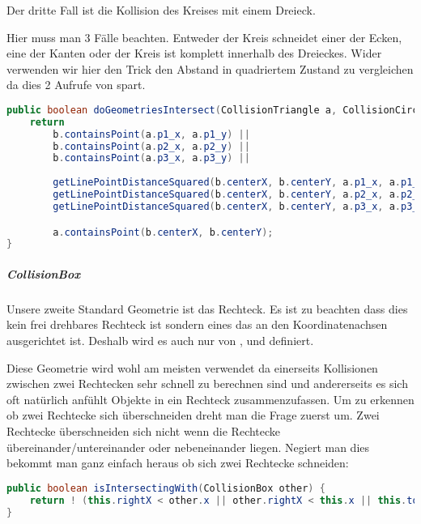 Der dritte Fall ist die Kollision des Kreises mit einem Dreieck.

Hier muss man 3 Fälle beachten. Entweder der Kreis schneidet einer der Ecken, eine der Kanten oder der Kreis ist komplett innerhalb des Dreieckes. Wider verwenden wir hier den Trick den Abstand in quadriertem Zustand zu vergleichen da dies 2 Aufrufe von  spart.


\doinline
\begin{lstlisting}[caption=Erkennen von Kollisionen (Kreis-Dreieck), title=\hspace{0 pt}, language=java]
public boolean doGeometriesIntersect(CollisionTriangle a, CollisionCircle b) {
	return 
		b.containsPoint(a.p1_x, a.p1_y) ||
		b.containsPoint(a.p2_x, a.p2_y) ||
		b.containsPoint(a.p3_x, a.p3_y) ||
		
		getLinePointDistanceSquared(b.centerX, b.centerY, a.p1_x, a.p1_y, a.p2_x, a.p2_y) <= (b.radius*b.radius) ||
		getLinePointDistanceSquared(b.centerX, b.centerY, a.p2_x, a.p2_y, a.p3_x, a.p3_y) <= (b.radius*b.radius) ||
		getLinePointDistanceSquared(b.centerX, b.centerY, a.p3_x, a.p3_y, a.p1_x, a.p1_y) <= (b.radius*b.radius) ||

		a.containsPoint(b.centerX, b.centerY);
}
\end{lstlisting}

\subparagraph{CollisionBox}

Unsere zweite Standard Geometrie ist das Rechteck. Es ist zu beachten dass dies kein frei drehbares Rechteck ist sondern eines das an den Koordinatenachsen ausgerichtet ist. Deshalb wird es auch nur von ,  und  definiert.

Diese Geometrie wird wohl am meisten verwendet da einerseits Kollisionen zwischen zwei Rechtecken sehr schnell zu berechnen sind und andererseits es sich oft natürlich anfühlt Objekte in ein Rechteck zusammenzufassen. Um zu erkennen ob zwei Rechtecke sich überschneiden dreht man die Frage zuerst um. Zwei Rechtecke überschneiden sich nicht wenn die Rechtecke übereinander/untereinander oder nebeneinander liegen. Negiert man dies bekommt man ganz einfach heraus ob sich zwei Rechtecke schneiden:

\doinline
\begin{lstlisting}[caption=Erkennen von Kollisionen (Box-Box), title=\hspace{0 pt}, language=java]
public boolean isIntersectingWith(CollisionBox other) {
	return ! (this.rightX < other.x || other.rightX < this.x || this.topY < other.y || other.topY < this.y);
}
\end{lstlisting}

